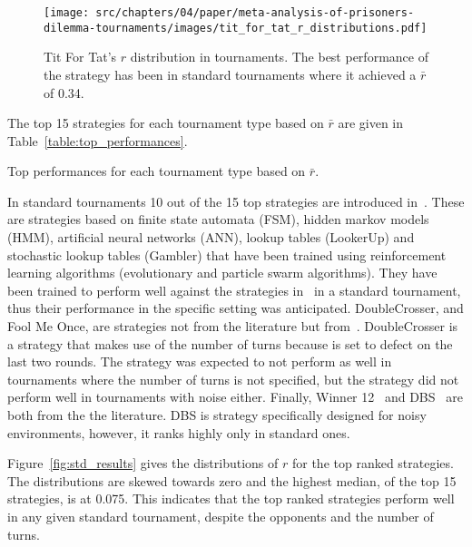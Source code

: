 \begin{figure}[!htbp]
    \centering
    \texttt{[image: src/chapters/04/paper/meta-analysis-of-prisoners-dilemma-tournaments/images/tit\_for\_tat\_r\_distributions.pdf]}
    \caption{Tit For Tat's $r$ distribution in tournaments. The best performance
    of the strategy has been in standard tournaments where it achieved a $\bar{r}$
    of 0.34.}
    \label{fig:tit_for_tat_r_distribution}
\end{figure}

The top 15 strategies for each tournament type based on \(\bar{r}\) are given in
Table~\ref{table:top_performances}.

\begin{table}[!htbp]
    \begin{center}
    \resizebox{.9\textwidth}{!}{
        
    }
\end{center}
\caption{Top performances for each tournament type based on $\bar{r}$.}
\label{table:top_performances}
\end{table}

In standard tournaments 10 out of the 15 top strategies are introduced
in~\cite{Harper2017}. These are strategies based on finite state automata (FSM),
hidden markov models (HMM), artificial neural networks (ANN), lookup tables
(LookerUp) and stochastic lookup tables (Gambler) that have been trained using
reinforcement learning algorithms (evolutionary and particle swarm algorithms).
They have been trained to perform well against the strategies
in~\cite{axelrodproject} in a standard tournament, thus their performance in the
specific setting was anticipated. DoubleCrosser, and Fool Me Once, are
strategies not from the literature but from~\cite{axelrodproject}. DoubleCrosser
is a strategy that makes use of the number of turns because is set to defect on
the last two rounds. The strategy was expected to not perform as well in
tournaments where the number of turns is not specified, but the strategy did not
perform well in tournaments with noise either. Finally, Winner
12~\cite{mathieu2017} and DBS~\cite{Au2006} are both from the the literature.
DBS is strategy specifically designed for noisy environments, however, it ranks
highly only in standard ones.

Figure~\ref{fig:std_results} gives the distributions of $r$ for the top
ranked strategies. The distributions are skewed towards zero and the highest
median, of the top 15 strategies, is at 0.075. This indicates that the top ranked
strategies perform well in any given standard tournament, despite the opponents and
the number of turns.

